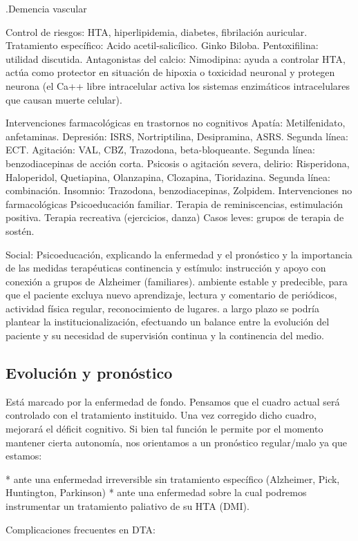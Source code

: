 \documentclass{scrbook}
\begin{document}
.Demencia vascular

Control de riesgos: HTA, hiperlipidemia, diabetes, fibrilación auricular. Tratamiento específico: Acido acetil-salicílico. Ginko Biloba. Pentoxifilina: utilidad discutida. Antagonistas del calcio: Nimodipina: ayuda a controlar HTA, actúa como protector en situación de hipoxia o toxicidad neuronal y protegen neurona (el Ca++ libre intracelular activa los sistemas enzimáticos intracelulares que causan muerte celular).

Intervenciones farmacológicas en trastornos no cognitivos Apatía: Metilfenidato, anfetaminas. Depresión: ISRS, Nortriptilina, Desipramina, ASRS. Segunda línea: ECT. Agitación: VAL, CBZ, Trazodona, beta-bloqueante. Segunda línea: benzodiacepinas de acción corta. Psicosis o agitación severa, delirio: Risperidona, Haloperidol, Quetiapina, Olanzapina, Clozapina, Tioridazina. Segunda línea: combinación. Insomnio: Trazodona, benzodiacepinas, Zolpidem. Intervenciones no farmacológicas Psicoeducación familiar. Terapia de reminiscencias, estimulación positiva. Terapia recreativa (ejercicios, danza) Casos leves: grupos de terapia de sostén.

Social: Psicoeducación, explicando la enfermedad y el pronóstico y la importancia de las medidas terapéuticas continencia y estímulo: instrucción y apoyo con conexión a grupos de Alzheimer (familiares). ambiente estable y predecible, para que el paciente excluya nuevo aprendizaje, lectura y comentario de periódicos, actividad física regular, reconocimiento de lugares. a largo plazo se podría plantear la institucionalización, efectuando un balance entre la evolución del paciente y su necesidad de supervisión continua y la continencia del medio.

\subsection*{Evolución y pronóstico}
Está marcado por la enfermedad de fondo. Pensamos que el cuadro actual será controlado con el tratamiento instituido. Una vez corregido dicho cuadro, mejorará el déficit cognitivo. Si bien tal función le permite por el momento mantener cierta autonomía, nos orientamos a un pronóstico regular/malo ya que estamos:

* ante una enfermedad irreversible sin tratamiento específico (Alzheimer, Pick, Huntington, Parkinson)
* ante una enfermedad sobre la cual podremos instrumentar un tratamiento paliativo de su HTA (DMI).

Complicaciones frecuentes en DTA:
\end{document}
